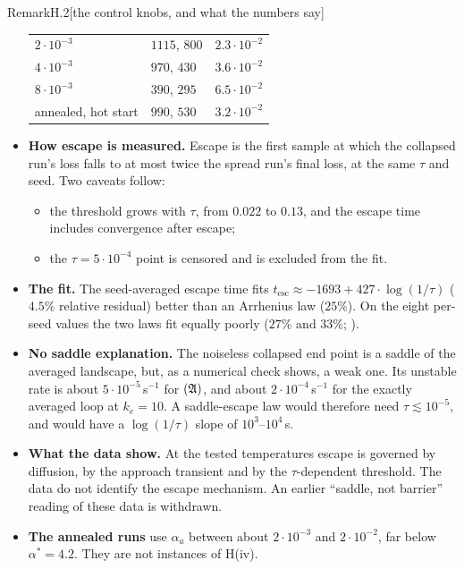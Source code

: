 \begin{rmk}{Remark}{H.2}[the control knobs, and what the numbers say]
\begin{itemize}
\begin{center}
\begin{tabular}{l>{\centering\arraybackslash}p{4.4cm}>{\centering\arraybackslash}p{3.4cm}}
      $2\cdot 10^{-3}$ & $1115$, $800$ & $2.3\cdot 10^{-2}$ \\
      $4\cdot 10^{-3}$ & $970$, $430$ & $3.6\cdot 10^{-2}$ \\
      $8\cdot 10^{-3}$ & $390$, $295$ & $6.5\cdot 10^{-2}$ \\
      annealed, hot start & $990$, $530$ & $3.2\cdot 10^{-2}$ \\
      \bottomrule
    \end{tabular}
  \end{center}
  \item \textbf{How escape is measured.} Escape is the first sample at which the collapsed run's loss falls to at
  most twice the spread run's final loss, at the same $\tau$ and seed. Two caveats follow:
  \begin{itemize}
    \item the threshold grows with $\tau$, from $0.022$ to $0.13$, and the escape time includes convergence after
    escape;
    \item the $\tau = 5\cdot 10^{-4}$ point is censored and is excluded from the fit.
  \end{itemize}
  \item \textbf{The fit.} The seed-averaged escape time fits $t_{\mathrm{esc}} \approx -1693 + 427\cdot\log(1/\tau)$
  ($4.5\%$ relative residual) better than an Arrhenius law ($25\%$). On the eight per-seed values the two laws fit
  equally poorly ($27\%$ and $33\%$; ).
  \item \textbf{No saddle explanation.} The noiseless collapsed end point is a saddle of the averaged landscape, but,
  as a numerical check shows, a weak one. Its unstable rate is about \mbox{$5\cdot 10^{-5}$\,s$^{-1}$} for $(\mathfrak{A})$, and about
  \mbox{$2\cdot 10^{-4}$\,s$^{-1}$} for the exactly averaged loop at $k_e = 10$. A saddle-escape law would therefore need
  $\tau \lesssim 10^{-5}$, and would have a $\log(1/\tau)$ slope of $10^3$--$10^4$\,s.
  \item \textbf{What the data show.} At the tested temperatures escape is governed by diffusion, by the approach
  transient and by the $\tau$-dependent threshold. The data do not identify the escape mechanism. An earlier
  ``saddle, not barrier'' reading of these data is withdrawn.
  \item \textbf{The annealed runs} use $\alpha_a$ between about $2\cdot 10^{-3}$ and $2\cdot 10^{-2}$, far below
  $\alpha^* = 4.2$. They are not instances of H(iv).
\end{itemize}
\end{rmk}

